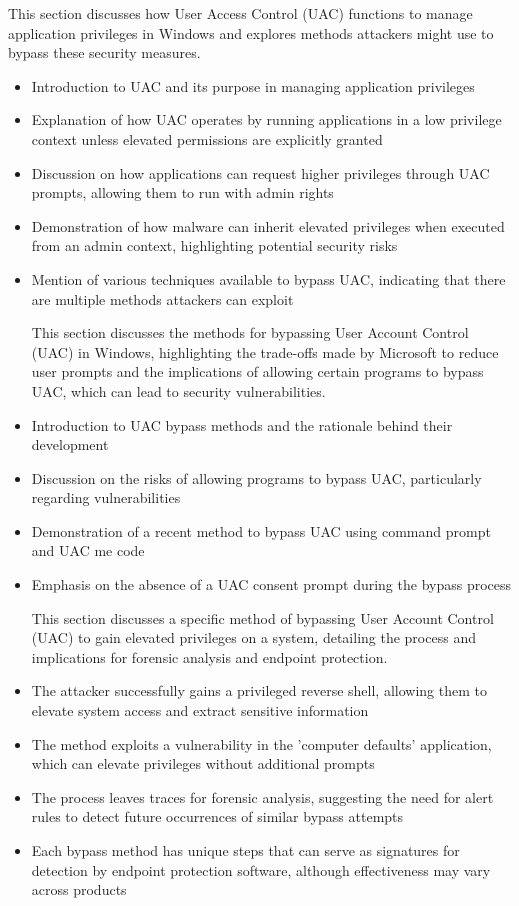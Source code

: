 This section discusses how User Access Control (UAC) functions to manage application privileges in Windows and explores methods attackers might use to bypass these security measures.
\begin{itemize}
    \item Introduction to UAC and its purpose in managing application privileges
    \item Explanation of how UAC operates by running applications in a low privilege context unless elevated permissions are explicitly granted
    \item Discussion on how applications can request higher privileges through UAC prompts, allowing them to run with admin rights
    \item Demonstration of how malware can inherit elevated privileges when executed from an admin context, highlighting potential security risks
    \item Mention of various techniques available to bypass UAC, indicating that there are multiple methods attackers can exploit

This section discusses the methods for bypassing User Account Control (UAC) in Windows, highlighting the trade-offs made by Microsoft to reduce user prompts and the implications of allowing certain programs to bypass UAC, which can lead to security vulnerabilities.
\item Introduction to UAC bypass methods and the rationale behind their development
\item Discussion on the risks of allowing programs to bypass UAC, particularly regarding vulnerabilities
\item Demonstration of a recent method to bypass UAC using command prompt and UAC me code
\item Emphasis on the absence of a UAC consent prompt during the bypass process

This section discusses a specific method of bypassing User Account Control (UAC) to gain elevated privileges on a system, detailing the process and implications for forensic analysis and endpoint protection.
\item The attacker successfully gains a privileged reverse shell, allowing them to elevate system access and extract sensitive information
\item The method exploits a vulnerability in the 'computer defaults' application, which can elevate privileges without additional prompts
\item The process leaves traces for forensic analysis, suggesting the need for alert rules to detect future occurrences of similar bypass attempts
\item Each bypass method has unique steps that can serve as signatures for detection by endpoint protection software, although effectiveness may vary across products


\end{itemize}
